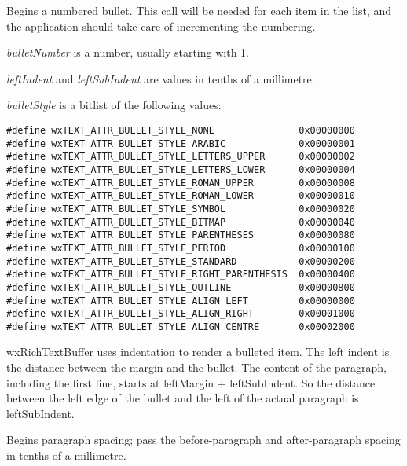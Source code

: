 Begins a numbered bullet. This call will be needed for each item in the list, and the
application should take care of incrementing the numbering.

{\it bulletNumber} is a number, usually starting with 1.

{\it leftIndent} and {\it leftSubIndent} are values in tenths of a millimetre.

{\it bulletStyle} is a bitlist of the following values:

{\small
\begin{verbatim}
#define wxTEXT_ATTR_BULLET_STYLE_NONE               0x00000000
#define wxTEXT_ATTR_BULLET_STYLE_ARABIC             0x00000001
#define wxTEXT_ATTR_BULLET_STYLE_LETTERS_UPPER      0x00000002
#define wxTEXT_ATTR_BULLET_STYLE_LETTERS_LOWER      0x00000004
#define wxTEXT_ATTR_BULLET_STYLE_ROMAN_UPPER        0x00000008
#define wxTEXT_ATTR_BULLET_STYLE_ROMAN_LOWER        0x00000010
#define wxTEXT_ATTR_BULLET_STYLE_SYMBOL             0x00000020
#define wxTEXT_ATTR_BULLET_STYLE_BITMAP             0x00000040
#define wxTEXT_ATTR_BULLET_STYLE_PARENTHESES        0x00000080
#define wxTEXT_ATTR_BULLET_STYLE_PERIOD             0x00000100
#define wxTEXT_ATTR_BULLET_STYLE_STANDARD           0x00000200
#define wxTEXT_ATTR_BULLET_STYLE_RIGHT_PARENTHESIS  0x00000400
#define wxTEXT_ATTR_BULLET_STYLE_OUTLINE            0x00000800
#define wxTEXT_ATTR_BULLET_STYLE_ALIGN_LEFT         0x00000000
#define wxTEXT_ATTR_BULLET_STYLE_ALIGN_RIGHT        0x00001000
#define wxTEXT_ATTR_BULLET_STYLE_ALIGN_CENTRE       0x00002000
\end{verbatim}
}

wxRichTextBuffer uses indentation to render a bulleted item. The left indent is the distance between
the margin and the bullet. The content of the paragraph, including the first line, starts
at leftMargin + leftSubIndent. So the distance between the left edge of the bullet and the
left of the actual paragraph is leftSubIndent.

\label{wxrichtextctrlbeginparagraphspacing}


Begins paragraph spacing; pass the before-paragraph and after-paragraph spacing in tenths of
a millimetre.

\label{wxrichtextctrlbeginparagraphstyle}


